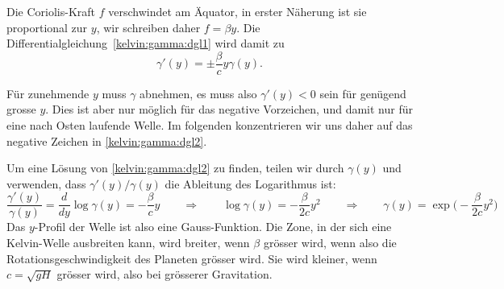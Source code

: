 Die Coriolis-Kraft $f$ verschwindet am Äquator, in erster Näherung
ist sie proportional zur $y$, wir schreiben daher $f=\beta y$.
Die Differentialgleichung~\eqref{kelvin:gamma:dgl1} wird damit zu
\begin{equation}
\gamma'(y)
=
\pm
\frac{\beta}{c} 
y\gamma(y).
\label{kelvin:gamma:dgl2}
\end{equation}

Für zunehmende $y$ muss $\gamma$ abnehmen, es muss also $\gamma'(y)<0$ sein
für genügend grosse $y$.
Dies ist aber nur möglich für das negative Vorzeichen, und damit nur
für eine nach Osten laufende Welle.
Im folgenden konzentrieren wir uns daher auf das negative Zeichen
in \eqref{kelvin:gamma:dgl2}.

Um eine Lösung von \eqref{kelvin:gamma:dgl2} zu finden, teilen wir
durch $\gamma(y)$
und verwenden, dass $\gamma'(y)/\gamma(y)$ die Ableitung des
Logarithmus ist:
\begin{equation}
\frac{\gamma'(y)}{\gamma(y)}
=
\frac{d}{dy}\log \gamma(y) = -\frac{\beta}{c} y
\qquad\Rightarrow\qquad
\log\gamma(y) = -\frac{\beta}{2c}y^2
\qquad\Rightarrow\qquad
\gamma(y) = \exp\biggl(
- \frac{\beta}{2c}y^2
\biggr)
\end{equation}
Das $y$-Profil der Welle ist also eine Gauss-Funktion.
Die Zone, in der sich eine Kelvin-Welle ausbreiten kann, 
wird breiter, wenn $\beta$ grösser wird, wenn also die 
Rotationsgeschwindigkeit des Planeten grösser wird.
Sie wird kleiner, wenn $c=\sqrt{gH}$ grösser wird, also
bei grösserer Gravitation.


